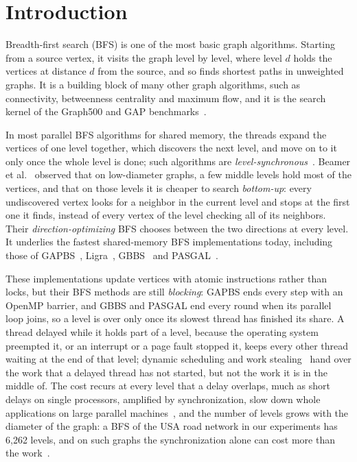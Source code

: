 \section{Introduction}
\label{sec:intro}

Breadth-first search (BFS) is one of the most basic graph algorithms. Starting from a source vertex, it visits the graph level by level, where level $d$ holds the vertices at distance $d$ from the source, and so finds shortest paths in unweighted graphs. It is a building block of many other graph algorithms, such as connectivity, betweenness centrality and maximum flow, and it is the search kernel of the Graph500 and GAP benchmarks~\cite{graph500, gapbs}.

In most parallel BFS algorithms for shared memory, the threads expand the vertices of one level together, which discovers the next level, and move on to it only once the whole level is done; such algorithms are \emph{level-synchronous}~\cite{bader_bfs, charles_bfs}. Beamer et al.~\cite{beamer_dobfs} observed that on low-diameter graphs, a few middle levels hold most of the vertices, and that on those levels it is cheaper to search \emph{bottom-up}: every undiscovered vertex looks for a neighbor in the current level and stops at the first one it finds, instead of every vertex of the level checking all of its neighbors. Their \emph{direction-optimizing} BFS chooses between the two directions at every level. It underlies the fastest shared-memory BFS implementations today, including those of GAPBS~\cite{gapbs}, Ligra~\cite{ligra}, GBBS~\cite{gbbs} and PASGAL~\cite{pasgal}.

These implementations update vertices with atomic instructions rather than locks, but their BFS methods are still \emph{blocking}: GAPBS ends every step with an OpenMP barrier, and GBBS and PASGAL end every round when its parallel loop joins, so a level is over only once its slowest thread has finished its share. A thread delayed while it holds part of a level, because the operating system preempted it, or an interrupt or a page fault stopped it, keeps every other thread waiting at the end of that level; dynamic scheduling and work stealing~\cite{blumofe_workstealing} hand over the work that a delayed thread has not started, but not the work it is in the middle of. The cost recurs at every level that a delay overlaps, much as short delays on single processors, amplified by synchronization, slow down whole applications on large parallel machines~\cite{petrini_noise, hoefler_noise}, and the number of levels grows with the diameter of the graph: a BFS of the USA road network in our experiments has 6,262 levels, and on such graphs the synchronization alone can cost more than the work~\cite{pasgal}.

